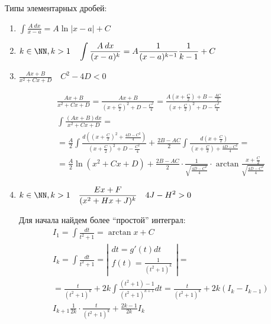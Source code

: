 Типы элементарных дробей:
\begin{enumerate}
    \item
        \(
            \displaystyle
            \int \frac{A \: dx}{x - a} = A \ln |x - a| + C
        \)
    \item
        \(
            \displaystyle
            k \in \NN, k > 1 \quad \int \frac{A \: dx}{(x - a)^k} = A \frac{1}{(x - a)^{k - 1}} \frac{1}{k - 1} + C
        \)
    \item
        \(
            \displaystyle
            \frac{Ax + B}{x^2 + Cx + D} \quad C^2 - 4D < 0
        \)

        \begin{gather*}
            \frac{Ax + B}{x^2 + Cx + D}
            =
            \frac{Ax + B}{\left(x + \frac{C}{2} \right)^2 + D - \frac{C^2}{4}}
            =
            \frac{A(x + \frac{C}{2}) + B - \frac{AC}{2}}{\left(x + \frac{C}{2} \right)^2 + D - \frac{C^2}{4}}
            \\
            \int \frac{\left( Ax + B \right) dx}{x^2 + Cx + D}
            =
            \\
            =
            \frac{A}{2} \int \frac{d \left( \left(x + \frac{C}{2} \right)^2 + \frac{4D - C^2}{4} \right)}{\left(x + \frac{C}{2} \right)^2 + D - \frac{C^2}{4}}
            +
            \frac{2B - AC}{2} \int \frac{d \left(x + \frac{C}{2} \right)}{\left( x + \frac{C}{2} \right) + \frac{4D - C^2}{4}}
            =
            \\
            =
            \frac{A}{2} \ln (x^2 + Cx + D) + \frac{2B - AC}{2} \cdot \frac{1}{\sqrt{\frac{4D - C^2}{4}}} \cdot \arctan \frac{x + \frac{C}{2}}{\sqrt{\frac{4D - C^2}{4}}}
        \end{gather*}

    \newpage

    \item
        \(
            \displaystyle
            k \in \NN, k > 1 \quad \frac{Ex + F}{(x^2 + Hx + J)^k} \quad 4J - H^2 > 0
        \)

        Для начала найдем более ``простой'' интеграл:
        \begin{gather*}
            I_1 = \int \frac{dt}{t^2 + 1}= \arctan x + C
            \\
            I_k = \int \frac{dt}{t^2 + 1} 
                = \left|
                    \begin{gathered}
                        dt = g'(t) dt
                        \\
                        f(t) = \frac{1}{(t^2 + 1)^k}
                    \end{gathered}
                \right|
            =
            \\
            =
            \frac{t}{(t^2 + 1)^k} + 2k \int \frac{(t^2 + 1) - 1}{(t^2 + 1)^{k + 1}} dt
            =
            \frac{t}{(t^2 + 1)^k} + 2k(I_k - I_{k - 1})
            \\
            I_{k + 1} \frac{1}{2k} \cdot \frac{t}{(t^2 + 1)^k} + \frac{2k - 1}{2k} I_k
        \end{gather*}


\end{enumerate}
